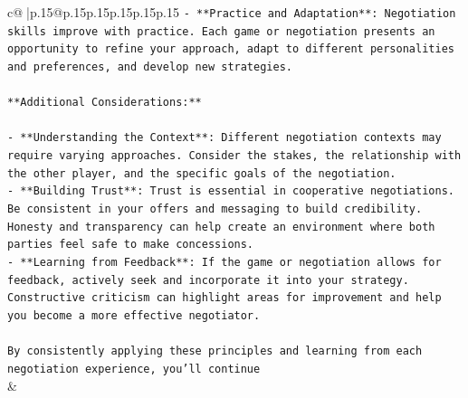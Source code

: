 \documentclass{article}
\begin{document}
{\begin{supertabular}{c@{$\;$}|p{.15\linewidth}@{}p{.15\linewidth}p{.15\linewidth}p{.15\linewidth}p{.15\linewidth}p{.15\linewidth}}
{{{\texttt{{-} **Practice and Adaptation**: Negotiation skills improve with practice. Each game or negotiation presents an opportunity to refine your approach, adapt to different personalities and preferences, and develop new strategies.} \\
\\ 
\texttt{**Additional Considerations:**} \\
\\ 
\texttt{{-} **Understanding the Context**: Different negotiation contexts may require varying approaches. Consider the stakes, the relationship with the other player, and the specific goals of the negotiation.} \\
\texttt{{-} **Building Trust**: Trust is essential in cooperative negotiations. Be consistent in your offers and messaging to build credibility. Honesty and transparency can help create an environment where both parties feel safe to make concessions.} \\
\texttt{{-} **Learning from Feedback**: If the game or negotiation allows for feedback, actively seek and incorporate it into your strategy. Constructive criticism can highlight areas for improvement and help you become a more effective negotiator.} \\
\\ 
\texttt{By consistently applying these principles and learning from each negotiation experience, you'll continue} \\
            }
        }
    }
    & \\ \\


\end{supertabular}}
\end{document}

